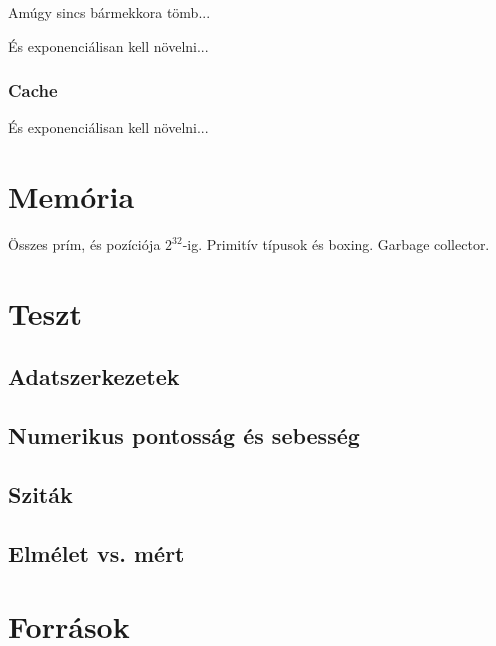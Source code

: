 \documentclass[12pt]{report}
\begin{document}
Amúgy sincs bármekkora tömb...

És exponenciálisan kell növelni...

\subsubsection{Cache}

És exponenciálisan kell növelni...

\section{Memória}

Összes prím, és pozíciója $2^32$-ig. Primitív típusok és boxing. Garbage collector.

\section{Teszt}

\subsection{Adatszerkezetek}

\subsection{Numerikus pontosság és sebesség}

\subsection{Sziták}

\subsection{Elmélet vs. mért}

\section{Források}
\end{document}
